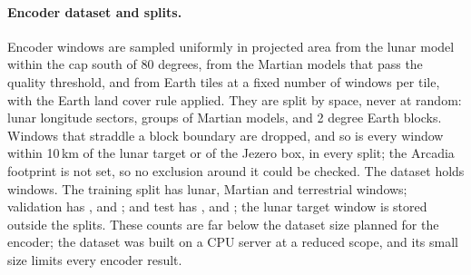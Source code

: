 \paragraph{Encoder dataset and splits.} Encoder windows are sampled uniformly in projected area from the lunar model within the cap south of 80 degrees, from the Martian models that pass the quality threshold, and from Earth tiles at a fixed number of windows per tile, with the Earth land cover rule applied. They are split by space, never at random: lunar longitude sectors, groups of Martian models, and 2 degree Earth blocks. Windows that straddle a block boundary are dropped, and so is every window within 10\,km of the lunar target or of the Jezero box, in every split; the Arcadia footprint is not set, so no exclusion around it could be checked. The dataset holds \DatasetWindows{} windows. The training split has \DatasetMoonWindows{} lunar, \DatasetMarsWindows{} Martian and \DatasetEarthWindows{} terrestrial windows; validation has \DatasetMoonVal, \DatasetMarsVal{} and \DatasetEarthVal; and test has \DatasetMoonTest, \DatasetMarsTest{} and \DatasetEarthTest; the lunar target window is stored outside the splits. These counts are far below the dataset size planned for the encoder; the dataset was built on a CPU server at a reduced scope, and its small size limits every encoder result.
